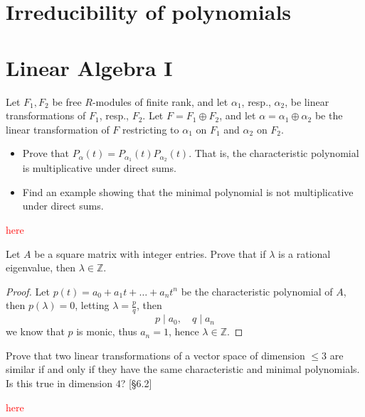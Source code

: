 \documentclass[openany]{book}
\newcommand{\Z}{\mathbb{Z}}
\begin{document}
\chapter{Irreducibility of polynomials}

\chapter{Linear Algebra I}




\begin{prob}[6.10]
    Let \( F_1, F_2 \) be free \( R \)-modules of finite rank, and let \( \alpha_1 \), resp., \( \alpha_2 \), be linear transformations of \( F_1 \), resp., \( F_2 \). Let \( F = F_1 \oplus F_2 \), and let \( \alpha = \alpha_1 \oplus \alpha_2 \) be the linear transformation of \( F \) restricting to \( \alpha_1 \) on \( F_1 \) and \( \alpha_2 \) on \( F_2 \).

    \begin{itemize}
        \item Prove that \( P_\alpha(t) = P_{\alpha_1}(t)P_{\alpha_2}(t) \). That is, the characteristic polynomial is multiplicative under direct sums.
    
        \item Find an example showing that the minimal polynomial is not multiplicative under direct sums.
    \end{itemize}
\end{prob}
\textcolor{red}{here}


\begin{prob}[6.13]
    Let $A$ be a square matrix with integer entries. Prove that if $\lambda$ is a rational eigenvalue, then $\lambda\in\mathbb{Z}$.
\end{prob}

\begin{proof}
    Let $p(t)=a_0+a_1t+\dots+a_nt^n$ be the characteristic polynomial of $A$, then $p(\lambda)=0$, letting $\lambda=\frac{p}{q}$, then 
    \begin{equation*}
        p\mid a_0,\quad q\mid a_n
    \end{equation*}
    we know that $p$ is monic, thus $a_n=1$, hence $\lambda\in\Z$.
\end{proof}

\begin{prob}[7.3]
    Prove that two linear transformations of a vector space of dimension \(\leq 3\) are similar if and only if they have the same characteristic and minimal polynomials. Is this true in dimension \(4\)? [§6.2]
\end{prob}
\textcolor{red}{here}
\end{document}
